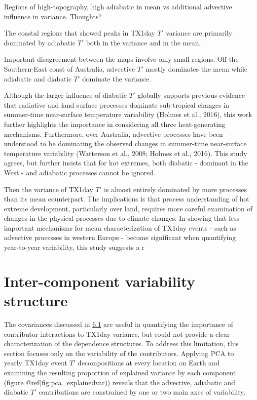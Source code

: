 \documentclass[11pt,a4paper,twoside,openright]{report}
\theoremstyle{definition}
\begin{document}
Regions of high-topography, high adiabatic in mean vs additional advective influence in variance. Thoughts?

The coastal regions that showed peaks in TX1day \(T'\) variance are primarily dominated by adiabatic \(T'\) both in the variance and in the mean.

Important disagreement between the maps involve only small regions. Off the Southern-East coast of Australia, advective \(T'\) mostly dominates the mean while adiabatic and diabatic \(T'\) dominate the variance.

Although the larger influence of diabatic \(T'\) globally supports previous evidence that radiative and land surface processes dominate sub-tropical changes in summer-time near-surface temperature variability (Holmes et al., 2016), this work further highlights the importance in considering all three heat-generating mechanisms. Furthermore, over Australia, advective processes have been understood to be dominating the observed changes in summer-time near-surface temperature variability (Watterson et al., 2008; Holmes et al., 2016). This study agrees, but further insists that for hot extremes, both diabatic - dominant in the West - and adiabatic processes cannot be ignored.

Then the variance of TX1day \(T'\) is almost entirely dominated by more processes than its mean counterpart. The implications is that process understanding of hot extreme development, particularly over land, requires more careful examination of changes in the physical processes due to climate changes. In showing that less important mechanisms for mean characterization of TX1day events - such as advective processes in western Europe - become significant when quantifying year-to-year variability, this study suggests a r

\section{Inter-component variability structure}\label{inter-component-variability-structure}

The covariances discussed in \hyperref[relating-tx1day-t-variability-to-component-variability]{6.1} are useful in quantifying the importance of contributor interactions to TX1day variance, but could not provide a clear characterization of the dependence structures. To address this limitation, this section focuses only on the variability of the contributors. Applying PCA to yearly TX1day event \(T'\) decompositions at every location on Earth and examining the resulting proportion of explained variance by each component (figure @ref(fig:pca\_explainedvar)) reveals that the advective, adiabatic and diabatic \(T'\) contributions are constrained by one or two main axes of variability.
\end{document}
